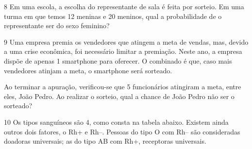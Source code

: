 \begin{escolha}
\begin{escolha}
\begin{escolha}
\begin{escolha}
{\begin{boxmedio}
\begin{boxpeq}
\begin{q°}
\begin{boxmedio}
\begin{boxpeq}
\begin{boxpeq}
\begin{boxmedio}
\begin{boxmedio}
\begin{boxmedio}
\begin{largebox}
\begin{boxmedio}
{\begin{enumerate}
\begin{boxpeq}
{\begin{boxpeq}
\begin{boxpeq}
\begin{boxmedio}
\begin{boxpeq}
\begin{boxpeq}
\begin{boxpeq}
{\begin{boxpeq}
\begin{boxmedio}
\begin{boxpeq}
\begin{boxpeq}
\begin{boxpeq}
\begin{boxpeq}
\begin{boxpeq}
\begin{boxpeq}


\num{8} Em uma escola, a escolha do representante de sala é feita por sorteio.
Em uma turma em que temos 12 meninas e 20 meninos, qual a probabilidade
de o representante ser do sexo feminino?

\begin{boxpeq}


\num{9} Uma empresa premia os vendedores que atingem a meta de
vendas, mas, devido a uma crise econômica, foi necessário limitar a 
premiação. Neste ano, a empresa dispõe de apenas 1 smartphone para 
oferecer. O combinado é que, caso mais vendedores atinjam 
a meta, o smartphone será sorteado.

Ao terminar a apuração, verificou-se que 5 funcionários atingiram a
meta, entre eles, João Pedro. Ao realizar o sorteio, qual a chance de
João Pedro não ser o sorteado?

\begin{boxpeq}


\num{10} Os tipos sanguíneos são 4, como consta na tabela abaixo. Existem ainda
outros dois fatores, o Rh+ e Rh--. Pessoas do tipo O com Rh-- são consideradas 
doadoras universais; as do tipo AB com Rh+, receptoras universais.


\end{boxpeq}
\end{boxpeq}
\end{boxpeq}
\end{boxpeq}
\end{boxpeq}
\end{boxpeq}
\end{boxpeq}
\end{boxpeq}
\end{boxmedio}
\end{boxpeq}}
\end{boxpeq}
\end{boxpeq}
\end{boxpeq}
\end{boxmedio}
\end{boxpeq}
\end{boxpeq}}
\end{boxpeq}
\end{enumerate}}
\end{boxmedio}
\end{largebox}
\end{boxmedio}
\end{boxmedio}
\end{boxmedio}
\end{boxpeq}
\end{boxpeq}
\end{boxmedio}
\end{q°}
\end{boxpeq}
\end{boxmedio}}
\end{escolha}
\end{escolha}
\end{escolha}
\end{escolha}
